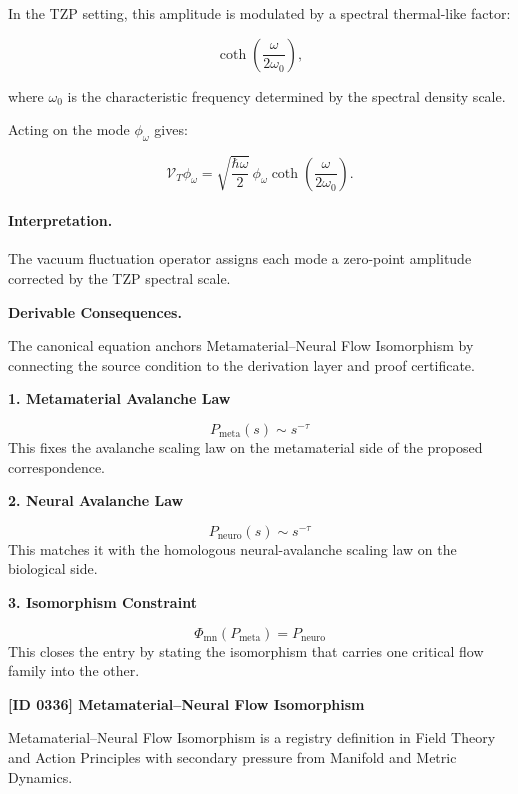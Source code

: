 In the TZP setting, this amplitude is modulated by a spectral thermal-like factor:

\begin{equation}
\coth\left(
\frac{\omega}{2\omega_0}
\right),
\end{equation}

where $\omega_0$ is the characteristic frequency determined by the spectral density scale.

Acting on the mode $\phi_{\omega}$ gives:

\begin{equation}
\boxed{
\mathcal{V}_T\phi_{\omega}
=
\sqrt{
\frac{\hbar\omega}{2}
}
\,\phi_{\omega}
\coth\left(
\frac{\omega}{2\omega_0}
\right).
}
\end{equation}

\paragraph{Interpretation.}
The vacuum fluctuation operator assigns each mode a zero-point amplitude corrected by the TZP spectral scale.

\par\vspace{0.35em}
\noindent\textbf{Derivable Consequences.}\quad
\begingroup
\footnotesize
\raggedright
The canonical equation anchors Metamaterial--Neural Flow Isomorphism by connecting the source condition to the derivation layer and proof certificate.
\par\endgroup

\noindent\textbf{1. Metamaterial Avalanche Law}\par
\[
P_{\mathrm{meta}}(s)\sim s^{-\tau}
\]
\noindent This fixes the avalanche scaling law on the metamaterial side of the proposed correspondence.\par
\noindent\textbf{2. Neural Avalanche Law}\par
\[
P_{\mathrm{neuro}}(s)\sim s^{-\tau}
\]
\noindent This matches it with the homologous neural-avalanche scaling law on the biological side.\par
\noindent\textbf{3. Isomorphism Constraint}\par
\[
\Phi_{\mathrm{mn}}(P_{\mathrm{meta}})=P_{\mathrm{neuro}}
\]
\noindent This closes the entry by stating the isomorphism that carries one critical flow family into the other.\par

\clearpage
\noindent\textbf{[ID 0336] Metamaterial--Neural Flow Isomorphism}\par
\vspace{0.35em}
\begingroup\small
{}
Metamaterial--Neural Flow Isomorphism is a registry definition in Field Theory and Action Principles with secondary pressure from Manifold and Metric Dynamics.

